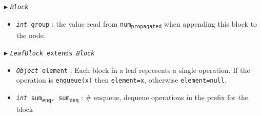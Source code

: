 \documentclass[10pt]{article}
\newcommand{\sub}[1]{\textsubscript{#1}}
\renewcommand{\tt}[1]{\texttt{#1}}
\renewcommand{\sl}[1]{\textsl{#1}}
\renewcommand{\it}[1]{\textit{#1}}
\newcommand{\cmt}[1]{\Comment{#1}}
\theoremstyle{definition}
\begin{document}
\begin{algorithm}
\begin{algorithmic}[1]
\begin{multicols}{2}
    

%  
%
%  

\Statex $\blacktriangleright$ \tt{\sl{Block}} 

\begin{itemize}

  \item \tt{\sl{int} group}
  \textsf{: the value read from \tt{num\sub{propagated}} when appending this block to the node.}
\end{itemize}

\pagebreak


\Statex $\blacktriangleright$ \tt{\sl{LeafBlock} extends \sl{Block}}
\begin{itemize}
  \item \tt{\sl{Object} element}
  \textsf{: Each block in a leaf represents a single operation. If the operation is \tt{enqueue(x)} then \tt{element=x}, otherwise \tt{element=null}.}
  
    \item \tt{\sl{int} sum\sub{enq}, sum\sub{deq}}
  \textsf{: \# enqueue, dequeue operations in the prefix for the block}
  
\end{itemize}




\end{multicols}
\end{algorithmic}
\end{algorithm}
\end{document}
